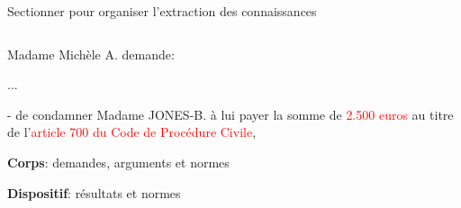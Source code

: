 \begin{frame}{Sectionner pour organiser l'extraction des connaissances}
\begin{columns}
\begin{column}{.55\linewidth}
{\begin{minipage}{\textwidth}
				Madame Michèle A. demande:
				
				...
				
				- de condamner Madame JONES-B. à lui payer la somme de \textcolor{red}{2.500 euros} au titre de l'\textcolor{red}{article 700 du Code de Procédure Civile}, 
		\end{minipage}}
		\vspace{0.1cm}
		
		{\normalsize \textbf{Corps}: demandes, arguments et normes }
		
		\vspace{0.4cm}
		
		\vspace{0.1cm}
		
		{\normalsize \textbf{Dispositif}: résultats et normes}
		
	\end{column}
\end{columns}
\end{frame}

